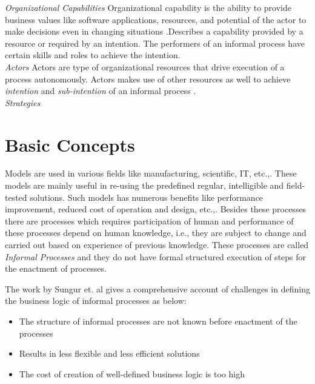 \textit{Organizational Capabilities} Organizational capability is the ability to provide business values like software applications, resources, and potential of the actor to make decisions even in changing situations \cite{Stirna2012}.Describes a capability provided by a resource or required by an intention. The performers of an informal process have certain skills and roles to achieve the intention.   \\

\textit{Actors} Actors are type of organizational resources that drive execution of a process autonomously. Actors makes use of other resources as well to achieve \textit{intention} and \textit{sub-intention} of an informal process \cite{Sungur2015}.  \\




\textit{Strategies}         \\

\section{Basic Concepts}
\label{sec:basicconcepts}
Models are used in various fields like manufacturing, scientific, IT, etc.,. These models are mainly useful in re-using the predefined regular, intelligible and field-tested solutions. Such models has numerous benefits like performance improvement, reduced cost of operation and design, etc.,. Besides these processes there are processes which requires participation of human and performance of these  processes depend on human knowledge, i.e., they are subject to change and carried out based on experience of previous knowledge. These processes are called \textit{Informal Processes} and they do not have formal structured execution of steps for the enactment of processes. 

The work by Sungur et. al \cite{Sungur2014a} gives a comprehensive account of challenges in defining the business logic of informal processes as below:

\begin{itemize}
	\item The structure of informal processes are not known before enactment of the processes
	\item Results in less flexible and less efficient solutions
	\item The cost of creation of well-defined business logic is too high
\end{itemize}

